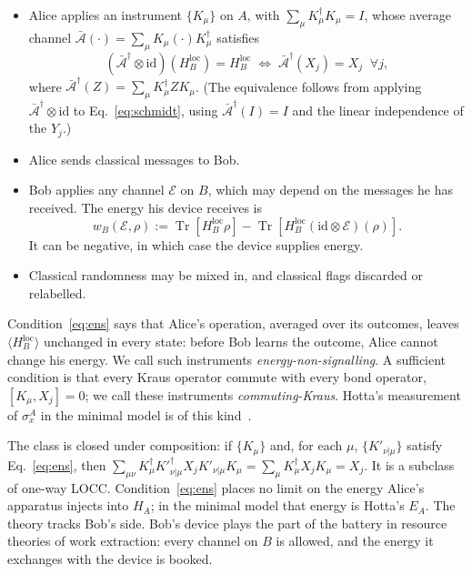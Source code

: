 \documentclass[aps,pra,twocolumn,reprint,superscriptaddress,nofootinbib,floatfix]{revtex4-2}
\theoremstyle{plain}
\theoremstyle{remark}
\newcommand{\Tr}{\operatorname{Tr}}
\newcommand{\id}{\mathrm{id}}
\newcommand{\HBl}{H_B^{\mathrm{loc}}}
\newcommand{\Abar}{\bar{\mathcal{A}}}
\newcommand{\E}{\mathcal{E}}
\begin{document}
\begin{itemize}
\item[(O1)] Alice applies an instrument $\{K_\mu\}$ on $A$, with
$\sum_\mu K_\mu^\dagger K_\mu=I$, whose average channel
$\Abar(\cdot)=\sum_\mu K_\mu(\cdot)K_\mu^\dagger$ satisfies
\begin{equation}
(\Abar^\dagger\otimes\id)(\HBl)=\HBl
\;\Longleftrightarrow\;
\Abar^\dagger(X_j)=X_j \;\;\forall j ,
\label{eq:ens}
\end{equation}
where $\Abar^\dagger(Z)=\sum_\mu K_\mu^\dagger Z K_\mu$. (The equivalence follows from
applying $\Abar^\dagger\otimes\id$ to Eq.~\eqref{eq:schmidt}, using
$\Abar^\dagger(I)=I$ and the linear independence of the $Y_j$.)
\item[(O2)] Alice sends classical messages to Bob.
\item[(O3)] Bob applies any channel $\E$ on $B$, which may depend on the messages he has
received. The energy his device receives is
\begin{equation}
w_B(\E,\rho):=\Tr[\HBl\rho]-\Tr[\HBl(\id\otimes\E)(\rho)] .
\label{eq:wB}
\end{equation}
It can be negative, in which case the device supplies energy.
\item[(O4)] Classical randomness may be mixed in, and classical flags discarded or
relabelled.
\end{itemize}

Condition~\eqref{eq:ens} says that Alice's operation, averaged over its outcomes, leaves
$\langle \HBl\rangle$ unchanged in every state: before Bob learns the outcome, Alice cannot
change his energy. We call such instruments \emph{energy-non-signalling}. A sufficient
condition is that every Kraus operator commute with every bond operator,
$[K_\mu,X_j]=0$; we call these instruments \emph{commuting-Kraus}. Hotta's measurement of
$\sigma_x^A$ in the minimal model is of this kind~\cite[Sec.~3]{Hotta2011review}.

The class is closed under composition: if $\{K_\mu\}$ and, for each $\mu$,
$\{K'_{\nu|\mu}\}$ satisfy Eq.~\eqref{eq:ens}, then
$\sum_{\mu\nu}K_\mu^\dagger K'^{\dagger}_{\nu|\mu}X_jK'_{\nu|\mu}K_\mu=\sum_\mu
K_\mu^\dagger X_j K_\mu=X_j$. It is a subclass of one-way LOCC. Condition~\eqref{eq:ens}
places no limit on the energy Alice's apparatus injects into $H_A$; in the minimal model
that energy is Hotta's $E_A$. The theory tracks Bob's side. Bob's device plays the part of
the battery in resource theories of work extraction: every channel on $B$ is allowed, and
the energy it exchanges with the device is booked.
\end{document}
